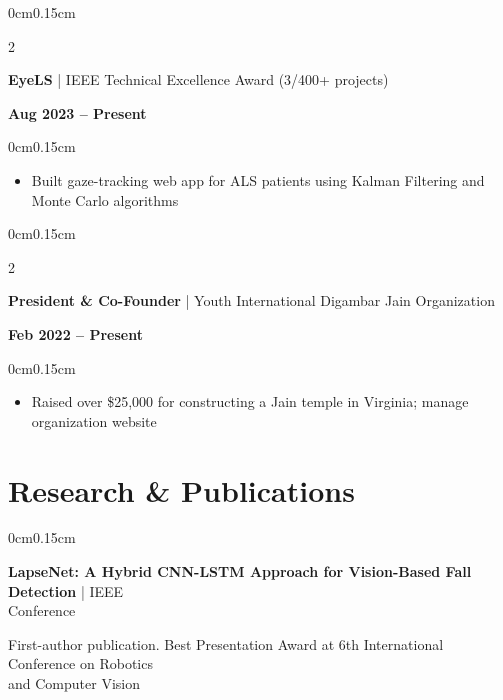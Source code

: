 \documentclass[10pt, letterpaper]{article}
\newenvironment{highlights}{
    \begin{itemize}[topsep=0pt, parsep=0pt, partopsep=0pt, itemsep=0pt, leftmargin=0.4cm]
}{
    \end{itemize}
}
\newenvironment{onecolentry}{
    \begin{adjustwidth}{0cm}{0.15cm}
}{
    \end{adjustwidth}
}
\newenvironment{twocolentry}[2][]{
    \onecolentry
    \def\secondColumn{#2}
    \setcolumnwidth{\fill, 4cm}
    \begin{paracol}{2}
}{
    \switchcolumn \raggedleft \secondColumn
    \end{paracol}
    \endonecolentry
}
\begin{document}
    \vspace{0.1cm}

    \begin{twocolentry}{\textbf{Aug 2023 -- Present}}
        \textbf{EyeLS} | IEEE Technical Excellence Award (3/400+ projects)
    \end{twocolentry}

    \vspace{0.05cm}
    \begin{onecolentry}
        \begin{highlights}
            \item Built gaze-tracking web app for ALS patients using Kalman Filtering and Monte Carlo algorithms
        \end{highlights}
    \end{onecolentry}

    \vspace{0.1cm}

    \begin{twocolentry}{\textbf{Feb 2022 -- Present}}
        \textbf{President \& Co-Founder} | Youth International Digambar Jain Organization
    \end{twocolentry}

    \vspace{0.05cm}
    \begin{onecolentry}
        \begin{highlights}
            \item Raised over \$25,000 for constructing a Jain temple in Virginia; manage organization website
        \end{highlights}
    \end{onecolentry}

    \section{Research \& Publications}
    \vspace{0.05cm}

    \begin{onecolentry}
        \textbf{LapseNet: A Hybrid CNN-LSTM Approach for Vision-Based Fall Detection} | IEEE\\Conference
        
        \vspace{0.05cm}
        First-author publication. Best Presentation Award at 6th International Conference on Robotics\\and Computer Vision
    \end{onecolentry}
\end{document}
